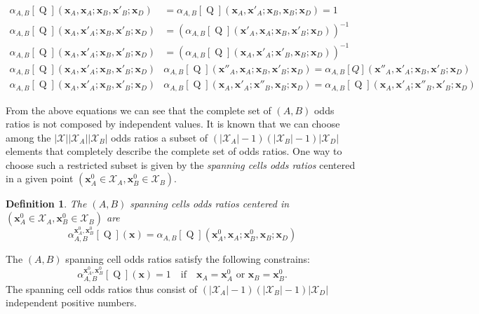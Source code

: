 \documentclass[11pt,a4paper, twoside]{book}
\newtheorem{definition}{Definition}[chapter]
\newcommand{\Pq}{\operatorname{Q}}
\newcommand{\bchi}{\boldsymbol{\mathcal{X}}}
\begin{document}
 \begin{align*} 
\alpha_{A,B}[\Pq](\mathbf{x}_A,\mathbf{x}_A;\mathbf{x}_B,\mathbf{x}'_B;\mathbf{x}_D)&=\alpha_{A,B}[\Pq](\mathbf{x}_A,\mathbf{x}'_A;\mathbf{x}_B,\mathbf{x}_B;\mathbf{x}_D)=1
 \\  \alpha_{A,B}[\Pq](\mathbf{x}_A,\mathbf{x}'_A;\mathbf{x}_B,\mathbf{x}'_B;\mathbf{x}_D)&=\left( \alpha_{A,B}[\Pq](\mathbf{x}'_A,\mathbf{x}_A;\mathbf{x}_B,\mathbf{x}'_B;\mathbf{x}_D) \right)^{-1} \\
  \alpha_{A,B}[\Pq](\mathbf{x}_A,\mathbf{x}'_A;\mathbf{x}_B,\mathbf{x}'_B;\mathbf{x}_D)&= \left( \alpha_{A,B}[\Pq](\mathbf{x}_A,\mathbf{x}'_A;\mathbf{x}'_B,\mathbf{x}_B;\mathbf{x}_D) \right)^{-1}
  \\
  \alpha_{A,B}[\Pq](\mathbf{x}_A,\mathbf{x}'_A;\mathbf{x}_B,\mathbf{x}'_B;\mathbf{x}_D)& \alpha_{A,B}[\Pq](\mathbf{x}''_A,\mathbf{x}_A;\mathbf{x}_B,\mathbf{x}'_B;\mathbf{x}_D)=\alpha_{A,B}[Q](\mathbf{x}''_A,\mathbf{x}'_A;\mathbf{x}_B,\mathbf{x}'_B;\mathbf{x}_D)
  \\
  \alpha_{A,B}[\Pq](\mathbf{x}_A,\mathbf{x}'_A;\mathbf{x}_B,\mathbf{x}'_B;\mathbf{x}_D)& \alpha_{A,B}[\Pq](\mathbf{x}_A,\mathbf{x}'_A;\mathbf{x}''_B,\mathbf{x}_B;\mathbf{x}_D)=\alpha_{A,B}[\Pq](\mathbf{x}_A,\mathbf{x}'_A;\mathbf{x}''_B,\mathbf{x}'_B;\mathbf{x}_D)
 \end{align*}
 
 From the above equations we can see that the complete set of $(A,B)$ odds ratios is not composed by independent values. It is known \citep{fienberg1968} that we can choose among the $|\bchi||\bchi_A||\bchi_B|$ odds ratios a subset of $(|\bchi_A|-1)(|\bchi_B|-1)|\bchi_D|$ elements that completely describe the complete set of odds ratios.
One way to choose such a restricted subset is given by the \textit{spanning cells odds ratios} \citep{fienberg1968} centered in a given point $(\mathbf{x}^0_A \in \bchi_A,  \mathbf{x}^0_B \in \bchi_B)$.

\begin{definition}
The $(A,B)$ spanning cells odds ratios centered in $(\mathbf{x}^0_A \in \bchi_A,  \mathbf{x}^0_B \in \bchi_B)$ are
$$ \alpha^{\mathbf{x}^0_A, \mathbf{x}^0_B}_{A,B}[\Pq](\mathbf{x}) = \alpha_{A,B}[\Pq](\mathbf{x}^0_A,\mathbf{x}_A;\mathbf{x}^0_B,\mathbf{x}_B;\mathbf{x}_D) $$
\end{definition}

The $(A,B)$ spanning cell odds ratios satisfy the following constrains:
\begin{equation}
\label{eq:alpha}
\alpha^{\mathbf{x}^0_A, \mathbf{x}^0_B}_{A,B}[\Pq](\mathbf{x})=1 \quad \text{if} \quad \mathbf{x}_A = \mathbf{x}^0_A \text{ or } \mathbf{x}_B = \mathbf{x}^0_B .
\end{equation} 
The spanning cell odds ratios thus consist of $(|\bchi_A|-1)(|\bchi_B|-1)|\bchi_D|$ independent positive numbers.
\end{document}
